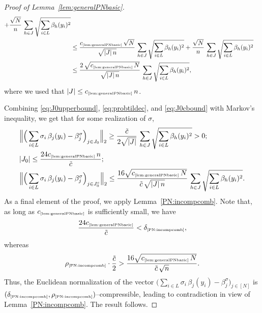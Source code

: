 \documentclass[11pt]{amsart}
\theoremstyle{definition}
\theoremstyle{plain}
\begin{document}
\begin{proof}[Proof of Lemma~\ref{lem:generalPNbasic}]
\begin{align}
    +
    \frac{\sqrt{N}}{n}\,
    \sum_{h\in J}\sqrt{\sum_{i\in L}\beta_h(y_i)^2}\nonumber\\
    &\leq
    \frac{c_{\text{\tiny\ref{lem:generalPNbasic}}}\,\sqrt{N}}{\sqrt{|J|\,n}}\,
    \sum_{h\in J}\sqrt{\sum_{i\in L}\beta_h(y_i)^2}
    +
    \frac{\sqrt{N}}{n}\,
    \sum_{h\in J}\sqrt{\sum_{i\in L}\beta_h(y_i)^2}\nonumber\\
    &\leq
    \frac{2\,\sqrt{c_{\text{\tiny\ref{lem:generalPNbasic}}}\,N}}{\sqrt{|J|\,n}}\,
    \sum_{h\in J}\sqrt{\sum_{i\in L}\beta_h(y_i)^2},\label{eq:J0cbound}
    \end{align}
    where we used that $|J|\leq c_{\text{\tiny\ref{lem:generalPNbasic}}}\,n$.

Combining \eqref{eq:J0upperbound}, \eqref{eq:probtildec},
and \eqref{eq:J0cbound} with Markov's inequality,
we get that for some realization of $\sigma$,
\begin{align*}
&\Big\|
\Big(\sum_{i\in L}\sigma_i\,\beta_j(y_i)-\beta^\sigma_j\Big)_{j\in J_0}\Big\|_2
\geq 
\frac{\tilde c}{2\sqrt{|J|}}\,\sum_{h\in J}\sqrt{\sum_{i\in L}\beta_h(y_i)^2}
>0
;\\
&|J_0|\leq \frac{24c_{\text{\tiny\ref{lem:generalPNbasic}}}\,n}{\tilde c};\\
&\Big\|
    \Big(\sum_{i\in L}\sigma_i\,\beta_j(y_i)-\beta^\sigma_j\Big)_{j\in J_0^c}\Big\|_2
\leq
\frac{16\sqrt{c_{\text{\tiny\ref{lem:generalPNbasic}}}\,N}}{\tilde c\,\sqrt{|J|\,n}}\,
    \sum_{h\in J}\sqrt{\sum_{i\in L}\beta_h(y_i)^2}.
\end{align*}
As a final element of the proof,
we apply Lemma~\ref{PN:incompcomb}.
Note that, as long as $c_{\text{\tiny\ref{lem:generalPNbasic}}}$
is sufficiently small, we have
$$
\frac{24c_{\text{\tiny\ref{lem:generalPNbasic}}}}{\tilde c}
<\delta_{\text{\tiny\ref{PN:incompcomb}}},
$$
whereas
$$
\rho_{\text{\tiny\ref{PN:incompcomb}}}\cdot
\frac{\tilde c}{2}>\frac{16\sqrt{c_{\text{\tiny\ref{lem:generalPNbasic}}}\,N}}{\tilde c\,\sqrt{n}}.
$$
Thus, the Euclidean normalization of the vector 
$
\big(\sum_{i\in L}\sigma_i\,\beta_j(y_i)-\beta^\sigma_j\big)_{j\in [N]}
$
is $(\delta_{\text{\tiny\ref{PN:incompcomb}}},
\rho_{\text{\tiny\ref{PN:incompcomb}}})$--compress\-ible,
leading to contradiction in view of Lemma~\ref{PN:incompcomb}.
The result follows.
\end{proof}
\end{document}
